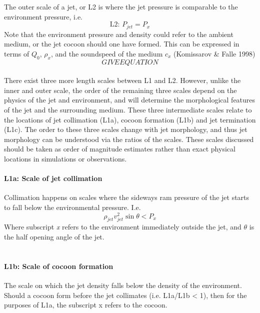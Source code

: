 \documentclass[12pt]{article}
\begin{document}
The outer scale of a jet, or L2 is where the jet pressure is comparable to the environment pressure, i.e.
\begin{equation}
\text{L2: }P_{jet} = P_{x}
\end{equation}
Note that the environment pressure and density could refer to the ambient medium, or the jet cocoon should one have formed. This can be expressed in terms of $Q_0$, $\rho_x$, and the soundspeed of the medium $c_x$ (Komissarov \& Falle 1998)
\begin{equation}
GIVE EQUATION
\end{equation}
\\
There exist three more length scales between L1 and L2. However, unlike the inner and outer scale, the order of the remaining three scales depend on the physics of the jet and environment, and will determine the morphological features of the jet and the surrounding medium. These three intermediate scales relate to the locations of jet collimation (L1a), cocoon formation (L1b) and jet termination (L1c). The order to these three scales change with jet morphology, and thus jet morphology can be understood via the ratios of the scales. These scales discussed should be taken as order of magnitude estimates rather than exact physical locations in simulations or observations.

\paragraph{L1a: Scale of jet collimation}
Collimation happens on scales where the sideways ram pressure of the jet starts to fall below the environmental pressure. I.e.
\begin{equation}
\rho_{jet}v_{jet}^{2}\sin{\theta} < P_{x}
\end{equation}
Where subscript \textit{x} refers to the environment immediately outside the jet, and $\theta$ is the half opening angle of the jet.\\
\\
\paragraph{L1b: Scale of cocoon formation}
The scale on which the jet density falls below the density of the environment. Should a cocoon form before the jet collimates (i.e. L1a/L1b < 1), then for the purposes of L1a, the subscript x refers to the cocoon.\\
\\
\end{document}
